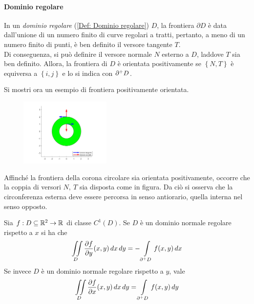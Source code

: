  \paragraph{Dominio regolare}
 In un \textit{dominio regolare} (\ref{Def: Dominio regolare}) $D$, la frontiera $\partial D$ è data dall'unione di un numero finito di curve regolari a tratti, pertanto, a meno di un numero finito di punti, è ben definito il versore tangente $T$.\\ 
 Di conseguenza, si può definire il versore normale $N$ esterno a $D$, laddove $T$ sia ben definito. Allora, la frontiera di $D$ è orientata positivamente se $\left\{N,T\right\}$ è equiversa a $\left\{i, j\right\}$ e lo si indica con $\partial^+ D$.\\
 \begin{example}
 Si mostri ora un esempio di frontiera positivamente orientata.
 \begin{figure}[H]
     \centering
\includegraphics[width=0.4\textwidth]{Capitoli/Capitolo5/Bordo orientato.png}
 \end{figure}
Affinché la frontiera della corona circolare sia orientata positivamente, occorre che la coppia di versori $N,\ T$ sia disposta come in figura. Da ciò si osserva che la circonferenza esterna deve essere percorsa in senso antiorario, quella interna nel senso opposto.
\end{example}
 \begin{theorem} \label{Teo: Formule di Gauss Green}
 Sia $f: D\subseteq \mathbb{R}^2 \to \mathbb{R}$ di classe $C^1(D)$. Se $D$ è un dominio normale regolare rispetto a $x$ si ha che
 \begin{equation} \label{Eq: Gauss-Green per dimostrazione}
     \iint\limits_D{\frac{\partial f}{\partial y}(x,y)}\,dx\,dy= -\int\limits_{\partial^+ D}{f(x,y)}\,dx
 \end{equation}
     Se invece $D$ è un dominio normale regolare rispetto a $y$, vale
     \begin{equation}
    \iint\limits_D{\frac{\partial f}{\partial x}(x,y)}\,dx\,dy= \int\limits_{\partial^+ D}{f(x,y)}\,dy
     \end{equation}
 \end{theorem}
